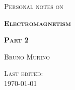 \begin{titlepage}
    \begin{center}
        \vspace*{2cm}
        
        \Large
        \textsc{Personal notes on}
        
        
        \vspace{1cm}
        \Huge
        \textsc{ \textbf{Electromagnetism}}
        
        
        \vspace{0.2cm}
        \huge
        \textsc{ \textbf{Part 2}}
        
        \vspace{1cm}
        \Large
        \textsc{ Bruno Murino}
        
        \vfill
        
        \textsc{ Last edited:}\\
        \textsc{ \today}
        
    \end{center}
\end{titlepage}